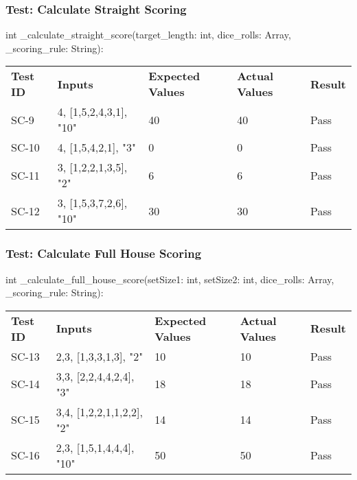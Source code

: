 \documentclass[12pt, titlepage]{article}
\begin{document}
\subsubsection{Test: Calculate Straight Scoring}
int \_calculate\_straight\_score(target\_length: int, dice\_rolls: Array, \_scoring\_rule: String):\\
\begin{tabularx}{\textwidth}{|p{2cm}|p{3.5cm}|p{4cm}|p{4cm}|p{1.5cm}|}
    \cline{1-5}
    \textbf{Test ID} & \textbf{Inputs} & \textbf{Expected Values} & \textbf{Actual Values} & \textbf{Result} \\
    \cline{1-5}
    SC-9 & 4, [1,5,2,4,3,1], "10" & 40 & 40 & Pass \\
    \cline{1-5}
    SC-10 & 4, [1,5,4,2,1], "3" & 0 & 0 & Pass \\
    \cline{1-5}
    SC-11 & 3, [1,2,2,1,3,5], "2" & 6 & 6 & Pass \\
    \cline{1-5}
    SC-12 & 3, [1,5,3,7,2,6], "10" & 30 & 30 & Pass \\
    \cline{1-5}
\end{tabularx}

\subsubsection{Test: Calculate Full House Scoring}
int \_calculate\_full\_house\_score(setSize1: int, setSize2: int, dice\_rolls: Array, \_scoring\_rule: String):\\
\begin{tabularx}{\textwidth}{|p{2cm}|p{3.5cm}|p{4cm}|p{4cm}|p{1.5cm}|}
    \cline{1-5}
    \textbf{Test ID} & \textbf{Inputs} & \textbf{Expected Values} & \textbf{Actual Values} & \textbf{Result} \\
    \cline{1-5}
    SC-13 & 2,3, [1,3,3,1,3], "2" & 10 & 10 & Pass \\
    \cline{1-5}
    SC-14 & 3,3, [2,2,4,4,2,4], "3" & 18 & 18 & Pass \\
    \cline{1-5}
    SC-15 & 3,4, [1,2,2,1,1,2,2], "2" & 14 & 14 & Pass \\
    \cline{1-5}
    SC-16 & 2,3, [1,5,1,4,4,4], "10" & 50 & 50 & Pass \\
    \cline{1-5}
\end{tabularx}
\end{document}
